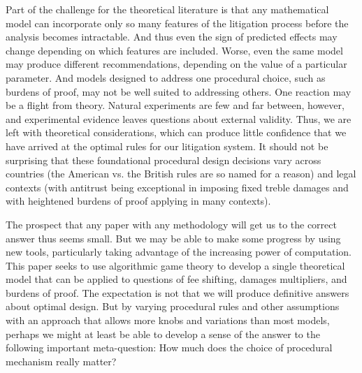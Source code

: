 \documentclass{article}
\begin{document}
Part of the challenge for the theoretical literature is that any mathematical model can incorporate only so many features of the litigation process before the analysis becomes intractable. And thus even the sign of predicted effects may change depending on which features are included. Worse, even the same model may produce different recommendations, depending on the value of a particular parameter. And models designed to address one procedural choice, such as burdens of proof, may not be well suited to addressing others. One reaction may be a flight from theory. Natural experiments are few and far between, however, and experimental evidence leaves questions about external validity. Thus, we are left with theoretical considerations, which can produce little confidence that we have arrived at the optimal rules for our litigation system. It should not be surprising that these foundational procedural design decisions vary across countries (the American vs. the British rules are so named for a reason) and legal contexts (with antitrust being exceptional in imposing fixed treble damages and with heightened burdens of proof applying in many contexts).

The prospect that any paper with any methodology will get us to the correct answer thus seems small. But we may be able to make some progress by using new tools, particularly taking advantage of the increasing power of computation. This paper seeks to use algorithmic game theory to develop a single theoretical model that can be applied to questions of fee shifting, damages multipliers, and burdens of proof. The expectation is not that we will produce definitive answers about optimal design. But by varying procedural rules and other assumptions with an approach that allows more knobs and variations than most models, perhaps we might at least be able to develop a sense of the answer to the following important meta-question: How much does the choice of procedural mechanism really matter? 
\end{document}
